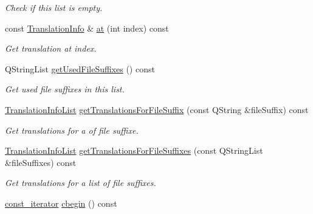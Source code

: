 \begin{DoxyCompactItemize}
\begin{DoxyCompactList}\small\item\em Check if this list is empty. \end{DoxyCompactList}\item 
const \hyperlink{class_mdt_1_1_translation_1_1_translation_info}{Translation\+Info} \& \hyperlink{class_mdt_1_1_translation_1_1_translation_info_list_a0efb37b86372c210a6249eecee599d1d}{at} (int index) const 
\begin{DoxyCompactList}\small\item\em Get translation at {\itshape index}. \end{DoxyCompactList}\item 
Q\+String\+List \hyperlink{class_mdt_1_1_translation_1_1_translation_info_list_a44ba14b74f59c1e9c99347979d3d7fca}{get\+Used\+File\+Suffixes} () const 
\begin{DoxyCompactList}\small\item\em Get used file suffixes in this list. \end{DoxyCompactList}\item 
\hyperlink{class_mdt_1_1_translation_1_1_translation_info_list}{Translation\+Info\+List} \hyperlink{class_mdt_1_1_translation_1_1_translation_info_list_aa6c88bbc32fb5d662daad65184f47d65}{get\+Translations\+For\+File\+Suffix} (const Q\+String \&file\+Suffix) const 
\begin{DoxyCompactList}\small\item\em Get translations for a of file suffixe. \end{DoxyCompactList}\item 
\hyperlink{class_mdt_1_1_translation_1_1_translation_info_list}{Translation\+Info\+List} \hyperlink{class_mdt_1_1_translation_1_1_translation_info_list_a5a7bc61e809dc3c943058fa6b6320f35}{get\+Translations\+For\+File\+Suffixes} (const Q\+String\+List \&file\+Suffixes) const 
\begin{DoxyCompactList}\small\item\em Get translations for a list of file suffixes. \end{DoxyCompactList}\item 
\hyperlink{class_mdt_1_1_translation_1_1_translation_info_list_a9e4747d959b7b20fc6e60d62552dc93e}{const\+\_\+iterator} \hyperlink{class_mdt_1_1_translation_1_1_translation_info_list_afcab9b0d8dd67efef6e6fa868eeb2dbe}{cbegin} () const \hypertarget{class_mdt_1_1_translation_1_1_translation_info_list_afcab9b0d8dd67efef6e6fa868eeb2dbe}{}\label{class_mdt_1_1_translation_1_1_translation_info_list_afcab9b0d8dd67efef6e6fa868eeb2dbe}


\end{DoxyCompactItemize}
